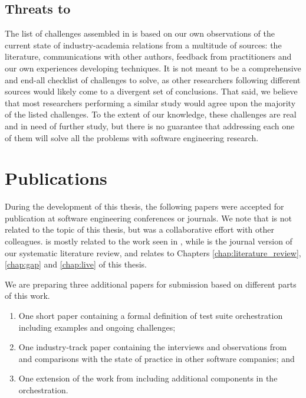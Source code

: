 \subsection{Threats to  }

The list of challenges assembled in  is based on our own observations of the current state of industry-academia relations from a multitude of sources: the literature, communications with other authors, feedback from practitioners and our own experiences developing techniques.
It is not meant to be a comprehensive and end-all checklist of challenges to solve, as other researchers following different sources would likely come to a divergent set of conclusions.
That said, we believe that most researchers performing a similar study would agree upon the majority of the listed challenges.
To the extent of our knowledge, these challenges are real and in need of further study, but there is no guarantee that addressing each one of them will solve all the problems with software engineering research.

\section{Publications}\label{sec:publications}

\begin{refsection}[P]
During the development of this thesis, the following papers were accepted for publication at software engineering conferences or journals.
We note that \cite{rossi2020defensive_p} is not related to the topic of this thesis, but was a collaborative effort with other colleagues.
\cite{greca_comparing_2022_p} is mostly related to the work seen in , while \cite{greca_live_2022_p} is the journal version of our systematic literature review, and relates to Chapters \ref{chap:literature_review}, \ref{chap:gap} and \ref{chap:live} of this thesis.

	\newrefcontext[labelprefix=P, sorting=ynt]
	\nocite{*}
    \printbibliography[heading=P]

We are preparing three additional papers for submission based on different parts of this work.

\begin{enumerate}
	\item One short paper containing a formal definition of test suite orchestration including examples and ongoing challenges;
	\item One industry-track paper containing the interviews and observations from  and comparisons with the state of practice in other software companies; and
	\item One extension of the work from  including additional components in the orchestration.
\end{enumerate}
   
\end{refsection}





%

